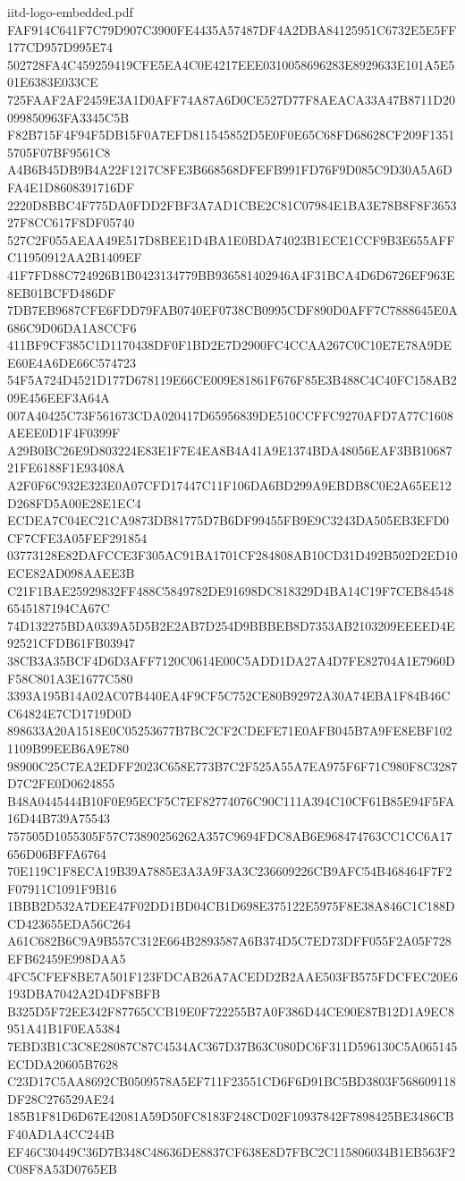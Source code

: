 \begin{filecontents*}[overwrite]{iitd-logo-embedded.pdf}
FAF914C641F7C79D907C3900FE4435A57487DF4A2DBA84125951C6732E5E5FF177CD957D995E74
502728FA4C459259419CFE5EA4C0E4217EEE0310058696283E8929633E101A5E501E6383E033CE
725FAAF2AF2459E3A1D0AFF74A87A6D0CE527D77F8AEACA33A47B8711D20099850963FA3345C5B
F82B715F4F94F5DB15F0A7EFD811545852D5E0F0E65C68FD68628CF209F13515705F07BF9561C8
A4B6B45DB9B4A22F1217C8FE3B668568DFEFB991FD76F9D085C9D30A5A6DFA4E1D8608391716DF
2220D8BBC4F775DA0FDD2FBF3A7AD1CBE2C81C07984E1BA3E78B8F8F365327F8CC617F8DF05740
527C2F055AEAA49E517D8BEE1D4BA1E0BDA74023B1ECE1CCF9B3E655AFFC11950912AA2B1409EF
41F7FD88C724926B1B0423134779BB936581402946A4F31BCA4D6D6726EF963E8EB01BCFD486DF
7DB7EB9687CFE6FDD79FAB0740EF0738CB0995CDF890D0AFF7C7888645E0A686C9D06DA1A8CCF6
411BF9CF385C1D1170438DF0F1BD2E7D2900FC4CCAA267C0C10E7E78A9DEE60E4A6DE66C574723
54F5A724D4521D177D678119E66CE009E81861F676F85E3B488C4C40FC158AB209E456EEF3A64A
007A40425C73F561673CDA020417D65956839DE510CCFFC9270AFD7A77C1608AEEE0D1F4F0399F
A29B0BC26E9D803224E83E1F7E4EA8B4A41A9E1374BDA48056EAF3BB1068721FE6188F1E93408A
A2F0F6C932E323E0A07CFD17447C11F106DA6BD299A9EBDB8C0E2A65EE12D268FD5A00E28E1EC4
ECDEA7C04EC21CA9873DB81775D7B6DF99455FB9E9C3243DA505EB3EFD0CF7CFE3A05FEF291854
03773128E82DAFCCE3F305AC91BA1701CF284808AB10CD31D492B502D2ED10ECE82AD098AAEE3B
C21F1BAE25929832FF488C5849782DE91698DC818329D4BA14C19F7CEB845486545187194CA67C
74D132275BDA0339A5D5B2E2AB7D254D9BBBEB8D7353AB2103209EEEED4E92521CFDB61FB03947
38CB3A35BCF4D6D3AFF7120C0614E00C5ADD1DA27A4D7FE82704A1E7960DF58C801A3E1677C580
3393A195B14A02AC07B440EA4F9CF5C752CE80B92972A30A74EBA1F84B46CC64824E7CD1719D0D
898633A20A1518E0C05253677B7BC2CF2CDEFE71E0AFB045B7A9FE8EBF1021109B99EEB6A9E780
98900C25C7EA2EDFF2023C658E773B7C2F525A55A7EA975F6F71C980F8C3287D7C2FE0D0624855
B48A0445444B10F0E95ECF5C7EF82774076C90C111A394C10CF61B85E94F5FA16D44B739A75543
757505D1055305F57C73890256262A357C9694FDC8AB6E968474763CC1CC6A17656D06BFFA6764
70E119C1F8ECA19B39A7885E3A3A9F3A3C236609226CB9AFC54B468464F7F2F07911C1091F9B16
1BBB2D532A7DEE47F02DD1BD04CB1D698E375122E5975F8E38A846C1C188DCD423655EDA56C264
A61C682B6C9A9B557C312E664B2893587A6B374D5C7ED73DFF055F2A05F728EFB62459E998DAA5
4FC5CFEF8BE7A501F123FDCAB26A7ACEDD2B2AAE503FB575FDCFEC20E6193DBA7042A2D4DF8BFB
B325D5F72EE342F87765CCB19E0F722255B7A0F386D44CE90E87B12D1A9EC8951A41B1F0EA5384
7EBD3B1C3C8E28087C87C4534AC367D37B63C080DC6F311D596130C5A065145ECDDA20605B7628
C23D17C5AA8692CB0509578A5EF711F23551CD6F6D91BC5BD3803F568609118DF28C276529AE24
185B1F81D6D67E42081A59D50FC8183F248CD02F10937842F7898425BE3486CBF40AD1A4CC244B
EF46C30449C36D7B348C48636DE8837CF638E8D7FBC2C115806034B1EB563F2C08F8A53D0765EB

\end{filecontents*}
